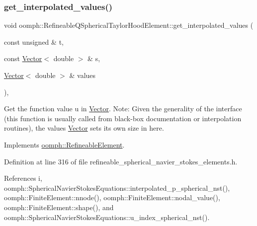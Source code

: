 \subsubsection{\texorpdfstring{get\+\_\+interpolated\+\_\+values()}{get\_interpolated\_values()}\hspace{0.1cm}{\footnotesize\ttfamily [2/2]}}
{\footnotesize\ttfamily void oomph\+::\+Refineable\+Q\+Spherical\+Taylor\+Hood\+Element\+::get\+\_\+interpolated\+\_\+values (\begin{DoxyParamCaption}\item[{const unsigned \&}]{t,  }\item[{const \hyperlink{classoomph_1_1Vector}{Vector}$<$ double $>$ \&}]{s,  }\item[{\hyperlink{classoomph_1_1Vector}{Vector}$<$ double $>$ \&}]{values }\end{DoxyParamCaption})\hspace{0.3cm}{\ttfamily [inline]}, {\ttfamily [virtual]}}



Get the function value u in \hyperlink{classoomph_1_1Vector}{Vector}. Note\+: Given the generality of the interface (this function is usually called from black-\/box documentation or interpolation routines), the values \hyperlink{classoomph_1_1Vector}{Vector} sets its own size in here. 



Implements \hyperlink{classoomph_1_1RefineableElement_ada6f0efe831ffefb1d2829ce01d45bfc}{oomph\+::\+Refineable\+Element}.



Definition at line 316 of file refineable\+\_\+spherical\+\_\+navier\+\_\+stokes\+\_\+elements.\+h.



References i, oomph\+::\+Spherical\+Navier\+Stokes\+Equations\+::interpolated\+\_\+p\+\_\+spherical\+\_\+nst(), oomph\+::\+Finite\+Element\+::nnode(), oomph\+::\+Finite\+Element\+::nodal\+\_\+value(), oomph\+::\+Finite\+Element\+::shape(), and oomph\+::\+Spherical\+Navier\+Stokes\+Equations\+::u\+\_\+index\+\_\+spherical\+\_\+nst().

\mbox{\label{classoomph_1_1RefineableQSphericalTaylorHoodElement_a0308ea44ae80a2e6bbb2453ee12482a2}} 
